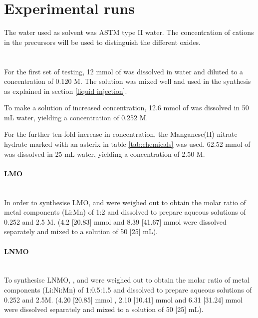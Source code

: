 \documentclass[Main/main.tex]{subfiles}
\begin{document}
\section{Experimental runs}
The water used as solvent was ASTM type II water. The concentration of cations in the precursors will be used to distinguish the different oxides.

\paragraph{}~\\
For the first set of testing, 12 mmol of  was dissolved in water and diluted to a concentration of 0.120 M. The solution was mixed well and used in the synthesis as explained in section \ref{liquid injection}.

To make a solution of increased concentration, 12.6 mmol of  was dissolved in 50 mL water, yielding a concentration of 0.252 M. 

For the further ten-fold increase in concentration, the Manganese(II) nitrate hydrate marked with an asterix in table \ref{tab:chemicals} was used. 62.52 mmol of  was dissolved in 25 mL water, yielding a concentration of 2.50 M.


\paragraph{LMO}~\\
In order to synthesise LMO,  and  were weighed out to obtain the molar ratio of metal components (Li:Mn) of 1:2 and dissolved to prepare aqueous solutions of 0.252 and 2.5 M. (4.2 [20.83] mmol  and 8.39 [41.67] mmol  were dissolved separately and mixed to a solution of 50 [25] mL).

\paragraph{LNMO}~\\
To synthesise LNMO, ,  and  were weighed out to obtain the molar ratio of metal components (Li:Ni:Mn) of 1:0.5:1.5 and dissolved to prepare aqueous solutions of 0.252 and 2.5M. (4.20 [20.85] mmol , 2.10 [10.41] mmol  and 6.31 [31.24] mmol  were dissolved separately and mixed to a solution of 50 [25] mL).
\end{document}
